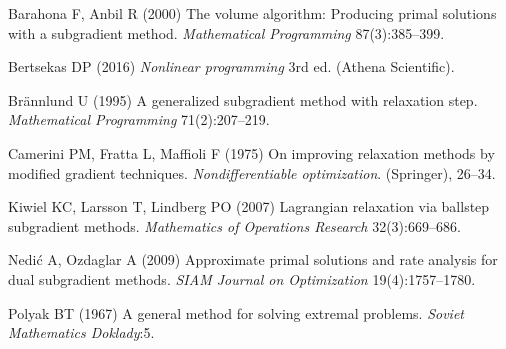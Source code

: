 \documentclass[
  a4paper,
,tablecaptionabove
]{scrartcl}
\numberwithin{equation}{section}
\begin{document}
\hypertarget{sec:refs}{}
\begin{CSLReferences}{1}{0}
  \leavevmode\hypertarget{sec:ref-barahona_volume_2000}{}%
  Barahona F, Anbil R (2000) The volume algorithm: Producing primal
  solutions with a subgradient method. \emph{Mathematical Programming}
  87(3):385--399.

  \leavevmode\hypertarget{sec:ref-bertsekas_nonlinear_2016}{}%
  Bertsekas DP (2016) \emph{Nonlinear programming} 3rd ed. (Athena
  Scientific).

  \leavevmode\hypertarget{sec:ref-brannlund1995generalized}{}%
  Brännlund U (1995) A generalized subgradient method with relaxation
  step. \emph{Mathematical Programming} 71(2):207--219.

  \leavevmode\hypertarget{sec:ref-camerini1975improving}{}%
  Camerini PM, Fratta L, Maffioli F (1975) On improving relaxation methods
  by modified gradient techniques. \emph{Nondifferentiable optimization}.
  (Springer), 26--34.

  \leavevmode\hypertarget{sec:ref-kiwiel_lagrangian_2007}{}%
  Kiwiel KC, Larsson T, Lindberg PO (2007) Lagrangian relaxation via
  ballstep subgradient methods. \emph{Mathematics of Operations Research}
  32(3):669--686.

  \leavevmode\hypertarget{sec:ref-nedic_approximate_2009}{}%
  Nedić A, Ozdaglar A (2009) Approximate primal solutions and rate
  analysis for dual subgradient methods. \emph{SIAM Journal on
    Optimization} 19(4):1757--1780.

  \leavevmode\hypertarget{sec:ref-polyak_general_1967}{}%
  Polyak BT (1967) A general method for solving extremal problems.
  \emph{Soviet Mathematics Doklady}:5.

\end{CSLReferences}
\end{document}
